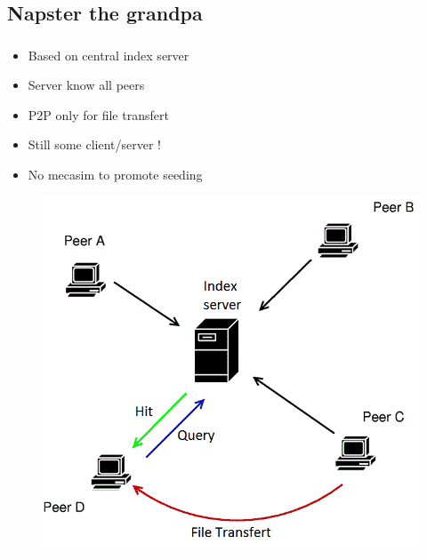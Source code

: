   \subsection{Napster the grandpa}
    \begin{frame}
      \frametitle{\secname}
      \framesubtitle{\subsecname}
      \begin{itemize}
        \item Based on central index server 
        \item Server know all peers
        \item P2P only for file transfert
        \item Still some client/server !
        \item No mecasim to promote seeding
      \end{itemize}
      \begin{figure}
        \centering
        \includegraphics[scale=0.2]{img/P2-napsterProtocol2_colored.png}
      \end{figure}
    \end{frame}


